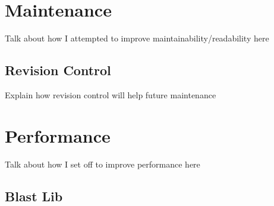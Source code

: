\chapter{Maintenance}
Talk about how I attempted to improve maintainability/readability here

\section{Revision Control}
Explain how revision control will help future maintenance 

\chapter{Performance}
Talk about how I set off to improve performance here

\section{Blast Lib}